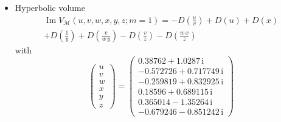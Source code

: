 \documentclass[12pt,reqno]{amsart}
\numberwithin{equation}{section}
\renewcommand{\Im}{\operatorname{Im}}
\newcommand{\I}{\mathrm{i}}
\begin{document}
\begin{itemize}
\item Hyperbolic volume
  \begin{multline*}
    \Im V_{\mathcal{M}}(u, v,w,x,y,z; m=1)
    =
    - D\left(\frac{u}{v}\right)
    + D\left(u \right)
    + D\left(x\right)
    \\
    + D\left(\frac{1}{y}\right)
    + D\left(\frac{v}{ w \, y}\right)
    - D\left(\frac{v}{z}\right)
    - D\left(\frac{w \, x}{z}\right)
  \end{multline*}
  with
  \begin{equation*}
    \begin{pmatrix}
      u \\ v \\ w \\ x \\ y \\ z
    \end{pmatrix}
    =
    \begin{pmatrix}
      0.38762  +   1.0287 \, \I
      \\
      -0.572726 + 0.717749 \, \I
      \\
      -0.259819 + 0.832925  \, \I
      \\
      0.18596 + 0.689115 \, \I
      \\
      0.365014  - 1.35264 \, \I
      \\
      -0.679246 - 0.851242 \, \I
    \end{pmatrix}
  \end{equation*}


\end{itemize}
\end{document}
